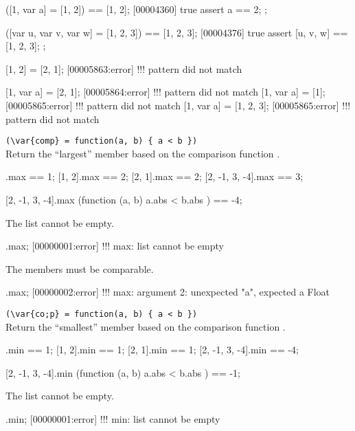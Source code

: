 \begin{urbiscriptapi}
\begin{urbiscript}
([1, var a] = [1, 2]) == [1, 2];
[00004360] true
assert
{
  a == 2;
};

([var u, var v, var w] = [1, 2, 3]) == [1, 2, 3];
[00004376] true
assert
{
  [u, v, w] == [1, 2, 3];
};

[1, 2] = [2, 1];
[00005863:error] !!! pattern did not match

[1, var a] = [2, 1];
[00005864:error] !!! pattern did not match
[1, var a] = [1];
[00005865:error] !!! pattern did not match
[1, var a] = [1, 2, 3];
[00005865:error] !!! pattern did not match
\end{urbiscript}


\item {}\lstinline|(\var{comp} = function(a, b) { a < b })|\\%
  Return the ``largest'' member based on the comparison function .
\begin{urbiassert}
           [1].max == 1;
        [1, 2].max == 2;
        [2, 1].max == 2;
[2, -1, 3, -4].max == 3;

[2, -1, 3, -4].max (function (a, b) { a.abs < b.abs }) == -4;
\end{urbiassert}

The list cannot be empty.

\begin{urbiscript}
[].max;
[00000001:error] !!! max: list cannot be empty
\end{urbiscript}

The members must be comparable.
\begin{urbiscript}
[0, 2, "a", 1].max;
[00000002:error] !!! max: argument 2: unexpected "a", expected a Float
\end{urbiscript}


\item {}\lstinline|(\var{co;p} = function(a, b) { a < b })|\\%
  Return the ``smallest'' member based on the comparison function .
\begin{urbiassert}
           [1].min == 1;
        [1, 2].min == 1;
        [2, 1].min == 1;
[2, -1, 3, -4].min == -4;

[2, -1, 3, -4].min (function (a, b) { a.abs < b.abs }) == -1;
\end{urbiassert}

The list cannot be empty.

\begin{urbiscript}
[].min;
[00000001:error] !!! min: list cannot be empty
\end{urbiscript}



\end{urbiscriptapi}
